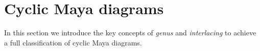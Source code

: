 \documentclass{amsart}
\theoremstyle{definition}
\newtheorem{definition}{Definition}
\begin{document}
\section{ Cyclic Maya diagrams}\label{sec:Mayacycles}

In this section we introduce the key concepts of \textit{genus} and
\textit{interlacing} to achieve a full classification of cyclic Maya
diagrams.


\end{document}
